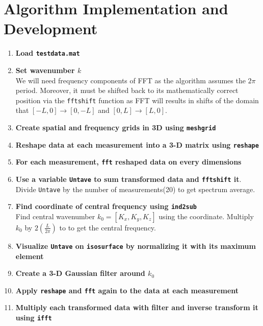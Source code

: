 \documentclass[11pt,a4paper]{article}
\numberwithin{equation}{subsection}
\begin{document}
\section{Algorithm Implementation and Development}
	\begin{enumerate}
		\item \textbf{Load \texttt{testdata.mat}}
		
		\item \textbf{Set wavenumber $k$}\\ 
		We will need frequency components of FFT as the algorithm assumes the $2\pi$ period. Moreover, it must be shifted back to its mathematically correct position via the \texttt{fftshift} function as FFT will results in shifts of the domain that $[-L, 0] \rightarrow [0, -L]$ and $[0, L] \rightarrow [L, 0]$.\cite{582notes}
		
		\item \textbf{Create spatial and frequency grids in 3D using \texttt{meshgrid}}
		
		\item \textbf{Reshape data at each measurement into a 3-D matrix using \texttt{reshape}}
		
		\item \textbf{For each measurement, \texttt{fft} reshaped data on every dimensions}
		\item \textbf{Use a variable \texttt{Untave} to sum transformed data and \texttt{fftshift} it}. 
		\\ Divide \texttt{Untave} by the number of measurements(20) to get spectrum average.
		
		\item \textbf{Find coordinate of central frequency using \texttt{ind2sub}}
		\\ Find central wavenumber $k_0 = [K_x, K_y, K_z]$ using the coordinate. Multiply $k_0$ by $2(\frac{L}{2\pi})$ to to get the central frequency.
		
		\item \textbf{Visualize \texttt{Untave} on \texttt{isosurface} by normalizing it with its maximum element}
		
		\item \textbf{Create a 3-D Gaussian filter around $k_0$}
		
		\item \textbf{Apply \texttt{reshape} and \texttt{fft} again to the data at each measurement}
		
		\item \textbf{Multiply each transformed data with filter and inverse transform it using \texttt{ifft}}
		

\end{enumerate}
\end{document}
